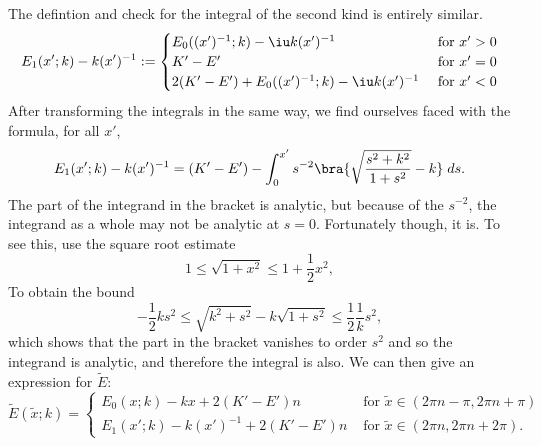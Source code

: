 The defintion and check for the integral of the second kind is entirely similar.
\[
E_1(x';k) - k(x')^{-1} :=
\begin{cases}
E_0((x')^{-1}; k) - \iu k(x')^{-1}                 & \text{ for } x' > 0 \\
K'-E'                                                   & \text{ for } x' = 0 \\
2(K'-E') + E_0((x')^{-1}; k)  - \iu k(x')^{-1}     & \text{ for } x' < 0
\end{cases}
\]
After transforming the integrals in the same way, we find ourselves faced with the formula, for all $x'$,
\[
E_1(x';k) - k(x')^{-1} = (K'-E') - \int_0^{x'} s^{-2}\bra{ \sqrt{\frac{s^2 + k^2}{1 + s^2}} - k }\;ds.
\]
The part of the integrand in the bracket is analytic, but because of the $s^{-2}$, the integrand as a whole may not be analytic at $s=0$. Fortunately though, it is. To see this, use the square root estimate
\[
1 \leq \sqrt {1 + x^2} \leq 1 + \frac{1}{2}x^2,
\]
To obtain the bound
\[
-\frac{1}{2}k s^2 \leq \sqrt{k^2 + s^2} - k \sqrt{1+s^2} \leq \frac{1}{2}\frac{1}{k} s^2,
\]
which shows that the part in the bracket vanishes to order $s^2$ and so the integrand is analytic, and therefore the integral is also. We can then give an expression for $\tilde{E}$:
\[
\tilde E(\tilde{x};k) =
\begin{cases}
E_0(x; k) - kx + 2(K'-E')n             & \text{ for } \tilde x \in (2πn - π, 2πn + π) \\
E_1(x'; k) -k(x')^{-1} + 2(K'-E')n     & \text{ for } \tilde x \in (2πn, 2πn + 2π).
\end{cases}
\]
